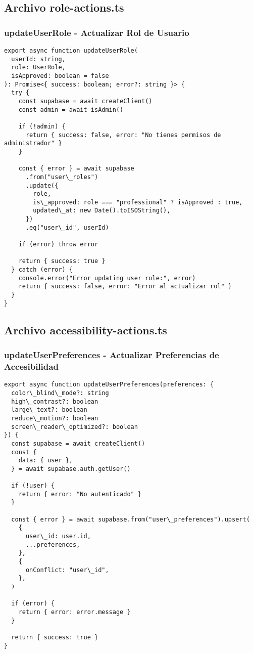 \documentclass[12pt,a4paper]{article}
\begin{document}
\subsection{Archivo role-actions.ts}

\subsubsection{updateUserRole - Actualizar Rol de Usuario}

\begin{lstlisting}[caption=Función updateUserRole completa]
export async function updateUserRole(
  userId: string,
  role: UserRole,
  isApproved: boolean = false
): Promise<{ success: boolean; error?: string }> {
  try {
    const supabase = await createClient()
    const admin = await isAdmin()

    if (!admin) {
      return { success: false, error: "No tienes permisos de administrador" }
    }

    const { error } = await supabase
      .from("user\_roles")
      .update({
        role,
        is\_approved: role === "professional" ? isApproved : true,
        updated\_at: new Date().toISOString(),
      })
      .eq("user\_id", userId)

    if (error) throw error

    return { success: true }
  } catch (error) {
    console.error("Error updating user role:", error)
    return { success: false, error: "Error al actualizar rol" }
  }
}
\end{lstlisting}

\subsection{Archivo accessibility-actions.ts}

\subsubsection{updateUserPreferences - Actualizar Preferencias de Accesibilidad}

\begin{lstlisting}[caption=Función updateUserPreferences completa]
export async function updateUserPreferences(preferences: {
  color\_blind\_mode?: string
  high\_contrast?: boolean
  large\_text?: boolean
  reduce\_motion?: boolean
  screen\_reader\_optimized?: boolean
}) {
  const supabase = await createClient()
  const {
    data: { user },
  } = await supabase.auth.getUser()

  if (!user) {
    return { error: "No autenticado" }
  }

  const { error } = await supabase.from("user\_preferences").upsert(
    {
      user\_id: user.id,
      ...preferences,
    },
    {
      onConflict: "user\_id",
    },
  )

  if (error) {
    return { error: error.message }
  }

  return { success: true }
}
\end{lstlisting}
\end{document}

